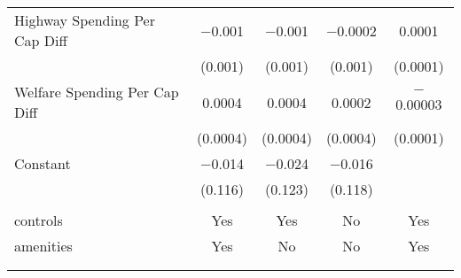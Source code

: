 \begin{table}[!htbp]
\begin{tabular}{@{\extracolsep{5pt}}lcccc}
  Highway Spending Per Cap Diff & $-$0.001 & $-$0.001 & $-$0.0002 & 0.0001 \\ 
  & (0.001) & (0.001) & (0.001) & (0.0001) \\ 
  Welfare Spending Per Cap Diff & 0.0004 & 0.0004 & 0.0002 & $-$0.00003 \\ 
  & (0.0004) & (0.0004) & (0.0004) & (0.0001) \\ 
  Constant & $-$0.014 & $-$0.024 & $-$0.016 &  \\ 
  & (0.116) & (0.123) & (0.118) &  \\ 
 \hline \\[-1.8ex] 
controls & Yes & Yes & No & Yes \\ 
amenities & Yes & No & No & Yes \\ 
\hline \\[-1.8ex] 
\hline 
\hline \\[-1.8ex] 
\end{tabular} 
\end{table} 
